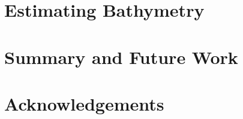 \documentclass[12pt]{article}
\begin{document}
\section{Estimating Bathymetry}





%

\section{Summary and Future Work}


\section{Acknowledgements}


%


\end{document}
